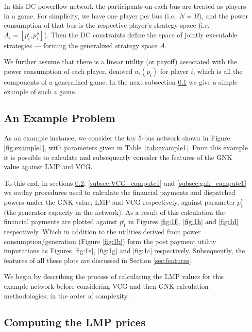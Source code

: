 In this DC powerflow network the participants on each bus are treated as players in a game.
For simplicity, we have one player per bus (i.e.~$N=B$), and the power consumption of that bus is the respective player's strategy space (i.e.\ $A_i=[p_i^l,p_i^u]$).
Then the DC constraints define the space of jointly executable strategies --- forming the generalized strategy space $A$.

We further assume that there is a linear utility (or payoff) associated with the power consumption of each player, denoted $u_i(p_i)$ for player $i$, which is all the components of a generalized game.
In the next subsection \ref{sec:example_network} we give a simple example of such a game.



\subsection{An Example Problem}\label{sec:example_network}

As an example instance, we consider the toy 5-bus network shown in Figure \ref{fig:example1}, with parameters given in Table~\ref{tab:example1}.
From this example it is possible to calculate and subsequently consider the features of the GNK value against LMP and VCG.

To this end, in sections \ref{subsec:LMP_compute1}, \ref{subsec:VCG_compute1} and \ref{subsec:gnk_compute1} we outlay procedures used to calculate the financial payments and dispatched powers under the GNK value, LMP and VCG respectively, against parameter $p_1^l$ (the generator capacity in the network).
As a result of this calculation the financial payments are plotted against $p_1^l$ in Figures \ref{fig:1f}, \ref{fig:1h} and \ref{fig:1d} respectively. Which in addition to the utilities derived from power consumption/generation (Figure \ref{fig:1b}) form the post payment utility imputations as Figures \ref{fig:1e}, \ref{fig:1g} and \ref{fig:1c} respectively.
Subsequently, the features of all these plots are discussed in Section \ref{sec:features}.

We begin by describing the process of calculating the LMP values for this example network before considering VCG and then GNK calculation methodologies; in the order of complexity.





\subsection{Computing the LMP prices}\label{subsec:LMP_compute1}

